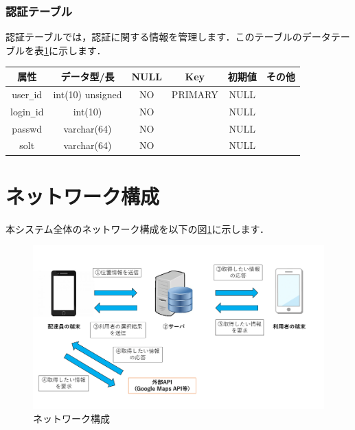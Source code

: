 \documentclass[a4j,titlepage]{jarticle}
\begin{document}
\subsubsection{認証テーブル}
認証テーブルでは，認証に関する情報を管理します．このテーブルのデータテーブルを表\ref{authTable}に示します．
\begin{table}[htb]
  \label{authTable}
  \begin{center}
    \begin{tabular}{|c|c|c|c|c|c|} \hline
      属性 & データ型/長 & NULL & Key & 初期値 & その他 \\ \hline \hline
      user\verb|_|id & int(10) unsigned & NO & PRIMARY & NULL & \\ \hline
      login\verb|_|id & int(10) & NO &   & NULL & \\ \hline
      passwd & varchar(64) & NO &   & NULL & \\ \hline
      solt & varchar(64) & NO &  & NULL & \\ \hline
    \end{tabular}
  \end{center}
\end{table}

\section{ネットワーク構成}
本システム全体のネットワーク構成を以下の図\ref{fig:i_f}に示します．

\begin{figure}[H]
 \begin{center}
  \includegraphics[width=140mm]{information_flow.png}
	\caption{ネットワーク構成}
	\label{fig:i_f}
 \end{center}

\end{figure}
\end{document}
